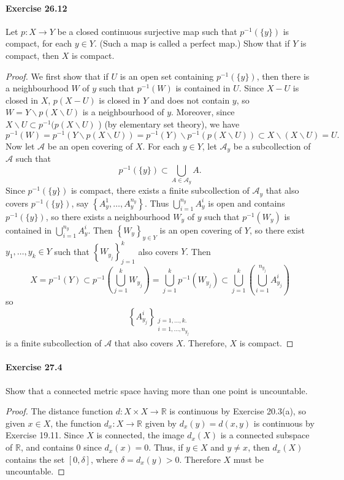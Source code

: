 \documentclass{article}
\begin{document}
\paragraph{Exercise 26.12} Let $p: X \rightarrow Y$ be a closed continuous surjective map such that $p^{-1}(\{y\})$ is compact, for each $y \in Y$. (Such a map is called a perfect map.) Show that if $Y$ is compact, then $X$ is compact.
\begin{proof}
    We first show that if $U$ is an open set containing $p^{-1}(\{y\})$, then there is a neighbourhood $W$ of $y$ such that $p^{-1}(W)$ is contained in $U$. Since $X-U$ is closed in $X$, $p(X-U)$ is closed in $Y$ and does not contain $y$, so $W=Y \backslash p(X \backslash U)$ is a neighbourhood of $y$. Moreover, since $X \backslash U \subset p^{-1}(p(X \backslash U)$ ) (by elementary set theory), we have
$$
p^{-1}(W)=p^{-1}(Y \backslash p(X \backslash U))=p^{-1}(Y) \backslash p^{-1}(p(X \backslash U)) \subset X \backslash(X \backslash U)=U .
$$
Now let $\mathcal{A}$ be an open covering of $X$. For each $y \in Y$, let $\mathcal{A}_y$ be a subcollection of $\mathcal{A}$ such that
$$
p^{-1}(\{y\}) \subset \bigcup_{A \in \mathcal{A}_y} A .
$$
Since $p^{-1}(\{y\})$ is compact, there exists a finite subcollection of $\mathcal{A}_y$ that also covers $p^{-1}(\{y\})$, say $\left\{A_y^1, \ldots, A_y^{n_y}\right\}$. Thus $\bigcup_{i=1}^{n_y} A_y^i$ is open and contains $p^{-1}(\{y\})$, so there exists a neighbourhood $W_y$ of $y$ such that $p^{-1}\left(W_y\right)$ is contained in $\bigcup_{i=1}^{n_y} A_y^i$. Then $\left\{W_y\right\}_{y \in Y}$ is an open covering of $Y$, so there exist $y_1, \ldots, y_k \in Y$ such that $\left\{W_{y_j}\right\}_{j=1}^k$ also covers $Y$. Then
$$
X=p^{-1}(Y) \subset p^{-1}\left(\bigcup_{j=1}^k W_{y_j}\right)=\bigcup_{j=1}^k p^{-1}\left(W_{y_j}\right) \subset \bigcup_{j=1}^k\left(\bigcup_{i=1}^{n_{y_j}} A_{y_j}^i\right)
$$
so
$$
\left\{A_{y_j}^i\right\}_{\substack{j=1, \ldots, k . \\ i=1, \ldots, n_{y_j}}}
$$
is a finite subcollection of $\mathcal{A}$ that also covers $X$. Therefore, $X$ is compact.
\end{proof}



\paragraph{Exercise 27.4} Show that a connected metric space having more than one point is uncountable.
\begin{proof}
    The distance function $d: X \times X \rightarrow \mathbb{R}$ is continuous by Exercise 20.3(a), so given $x \in X$, the function $d_x: X \rightarrow \mathbb{R}$ given by $d_x(y)=d(x, y)$ is continuous by Exercise 19.11. Since $X$ is connected, the image $d_x(X)$ is a connected subspace of $\mathbb{R}$, and contains 0 since $d_x(x)=0$. Thus, if $y \in X$ and $y \neq x$, then $d_x(X)$ contains the set $[0, \delta]$, where $\delta=d_x(y)>0$. Therefore $X$ must be uncountable.
\end{proof}
\end{document}
